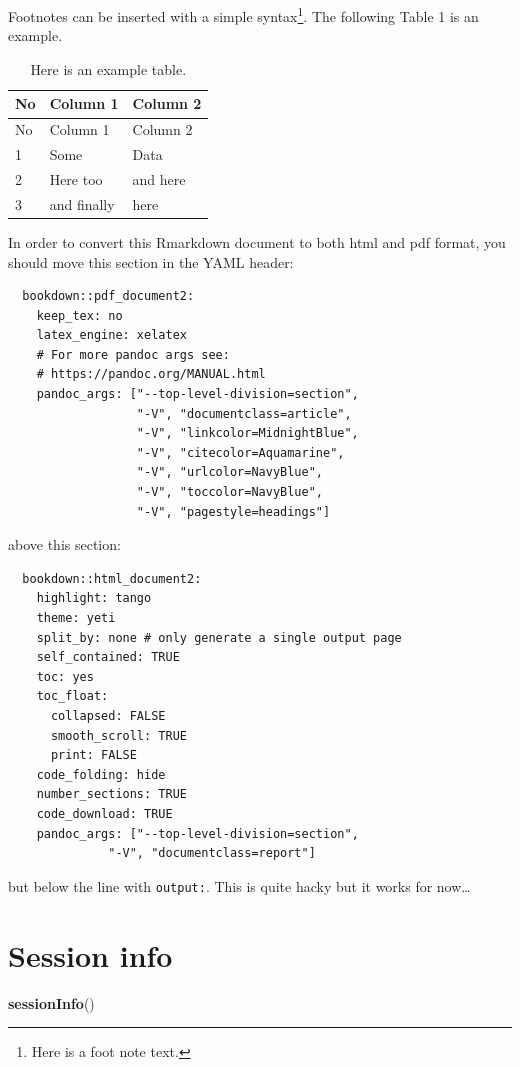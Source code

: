 \documentclass[
]{article}
\newenvironment{Shaded}{\begin{snugshade}}{\end{snugshade}}
\newcommand{\KeywordTok}[1]{\textcolor[rgb]{0.13,0.29,0.53}{\textbf{#1}}}
\newcommand{\NormalTok}[1]{#1}
\let\rmarkdownfootnote\footnote%
\def\footnote{\protect\rmarkdownfootnote}
\begin{document}
Footnotes can be inserted with a simple syntax\footnote{Here is a foot note text.}. The following Table 1 is an example.

\begin{longtable}[]{@{}lll@{}}
\caption{Here is an example table.}\tabularnewline
\toprule
No & Column 1 & Column 2\tabularnewline
\midrule
\endfirsthead
\toprule
No & Column 1 & Column 2\tabularnewline
\midrule
\endhead
1 & Some & Data\tabularnewline
2 & Here too & and here\tabularnewline
3 & and finally & here\tabularnewline
\bottomrule
\end{longtable}

In order to convert this Rmarkdown document to both html and pdf format, you should move this section in the YAML header:

\begin{verbatim}
  bookdown::pdf_document2:
    keep_tex: no
    latex_engine: xelatex
    # For more pandoc args see:
    # https://pandoc.org/MANUAL.html
    pandoc_args: ["--top-level-division=section",
                  "-V", "documentclass=article",
                  "-V", "linkcolor=MidnightBlue",
                  "-V", "citecolor=Aquamarine",
                  "-V", "urlcolor=NavyBlue",
                  "-V", "toccolor=NavyBlue",
                  "-V", "pagestyle=headings"]
\end{verbatim}

above this section:

\begin{verbatim}
  bookdown::html_document2:
    highlight: tango
    theme: yeti
    split_by: none # only generate a single output page
    self_contained: TRUE
    toc: yes
    toc_float: 
      collapsed: FALSE
      smooth_scroll: TRUE
      print: FALSE
    code_folding: hide
    number_sections: TRUE
    code_download: TRUE
    pandoc_args: ["--top-level-division=section",
              "-V", "documentclass=report"]
\end{verbatim}

but below the line with \texttt{output:}. This is quite hacky but it works for now\ldots{}

\clearpage

\hypertarget{session-info}{%
\section{Session info}\label{session-info}}

\begin{Shaded}
\begin{Highlighting}[]
\KeywordTok{sessionInfo}\NormalTok{()}
\end{Highlighting}
\end{Shaded}
\end{document}
